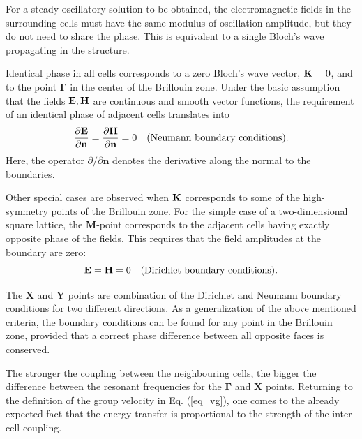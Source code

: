 For a steady oscillatory solution to be obtained, the electromagnetic fields in the surrounding cells must have the same modulus of oscillation amplitude, but they do not need to share the phase. This is equivalent to a single Bloch's wave propagating in the structure. 

Identical phase in all cells corresponds to a zero Bloch's wave vector, ${\mathbf{K}} = 0$, and to the point $\mathbf{\Gamma}$ in the center of the Brillouin zone. Under the basic assumption that the fields $\mathbf{E}, \mathbf{H}$ are continuous and smooth vector functions, the requirement of an identical phase of adjacent cells translates into
\begin{equation} \frac{\partial \mathbf{E}}{\partial\mathbf{n}} = \frac{\partial \mathbf{H}}{\partial\mathbf{n}} = 0 \quad\text{(Neumann boundary conditions).} \label{eq_bcond_neumann}\end{equation} 
Here, the operator $\partial/\partial \mathbf{n}$ denotes the derivative along the normal to the boundaries.

Other special cases are observed when ${\mathbf{K}}$ corresponds to some of the high-symmetry points of the Brillouin zone. For the simple case of a two-dimensional square lattice, the $\mathbf{M}$-point corresponds to the adjacent cells having exactly opposite phase of the fields. This requires that the field amplitudes at the boundary are zero:
\begin{equation} \mathbf{E} = \mathbf{H} = 0 \quad\text{(Dirichlet boundary conditions).} \label{eq_bcond_dirichlet}\end{equation} 

The $\mathbf{X}$ and $\mathbf{Y}$ points are combination of the Dirichlet and Neumann boundary conditions for two different directions.
As a generalization of the above mentioned criteria, the boundary conditions can be found for any point in the Brillouin zone, provided that a correct phase difference between all opposite faces is conserved.

The stronger the coupling between the neighbouring cells, the bigger the difference between the resonant frequencies for the $\mathbf{\Gamma}$ and $\mathbf{X}$ points. Returning to the definition of the group velocity in Eq. (\ref{eq_vg}), one comes to the already expected fact that the energy transfer is proportional to the strength of the inter-cell coupling.


